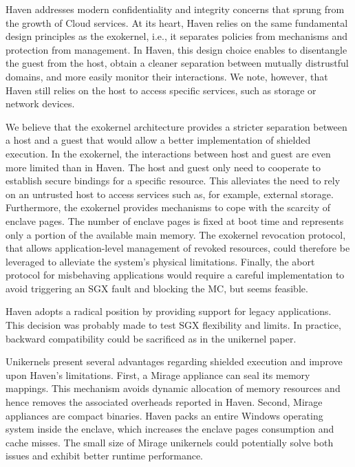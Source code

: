 Haven addresses modern confidentiality and integrity concerns that sprung from the growth of Cloud services.
At its heart, Haven relies on the same fundamental design principles as the exokernel, i.e., it separates policies from mechanisms and protection from management.
In Haven, this design choice enables to disentangle the guest from the host, obtain a cleaner separation between mutually distrustful domains, and more easily monitor their interactions.
We note, however, that Haven still relies on the host to access specific services, such as storage or network devices.

We believe that the exokernel architecture provides a stricter separation between a host and a guest that would allow a better implementation of shielded execution.
In the exokernel, the interactions between host and guest are even more limited than in Haven.
The host and guest only need to cooperate to establish secure bindings for a specific resource.
This alleviates the need to rely on an untrusted host to access services such as, for example, external storage.
Furthermore, the exokernel provides mechanisms to cope with the scarcity of enclave pages.
The number of enclave pages is fixed at boot time and represents only a portion of the available main memory.
The exokernel revocation protocol, that allows application-level management of revoked resources, could therefore be leveraged to alleviate the system's physical limitations.
Finally, the abort protocol for misbehaving applications would require a careful implementation to avoid triggering an SGX fault and blocking the MC, but seems feasible.

Haven adopts a radical position by providing support for legacy applications.
This decision was probably made to test SGX flexibility and limits.
In practice, backward compatibility could be sacrificed as in the unikernel paper.

Unikernels present several advantages regarding shielded execution and improve upon Haven's limitations.
First, a Mirage appliance can seal its memory mappings.
This mechanism avoids dynamic allocation of memory resources and hence removes the associated overheads reported in Haven.
Second, Mirage appliances are compact binaries.
Haven packs an entire Windows operating system inside the enclave, which increases the enclave pages consumption and cache misses.
The small size of Mirage unikernels could potentially solve both issues and exhibit better runtime performance.
